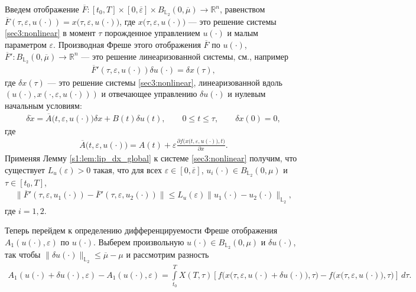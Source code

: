 \documentclass[../main.tex]{subfiles}
\begin{document}
Введем отображение $\overline{F}: [t_0,T] \times [0,\overline{\varepsilon}] \times B_{\mathbb{L}_2}(0,\overline{\mu}) \to \mathbb{R}^n$, равенством $\overline{F}(\tau,\varepsilon, u(\cdot)) = x \big(\tau,\varepsilon, u(\cdot)\big) $, где $x \big(\tau,\varepsilon, u(\cdot)\big)$ --- это решение системы \eqref{sec3:nonlinear} в момент $\tau$ порожденное управлением $u(\cdot)$ и малым параметром $\varepsilon$. 
Производная Фреше этого отображения $\overline{F}$ по $u(\cdot)$, $\overline{F}': B_{\mathbb{L}_2}(0,\overline{\mu}) \to \mathbb{R}^n $ --- это решение линеаризованной системы, см., например \cite{GusZyk}
\begin{gather}\label{dF}
 \overline{F}'(\tau,\varepsilon, u(\cdot)) \delta u(\cdot) = \delta x(\tau), 
\end{gather}
где $\delta x(\tau)$ --- это решение системы \eqref{sec3:nonlinear}, линеаризованной вдоль $(u(\cdot),x(\cdot,\varepsilon, u(\cdot)))$ и отвечающее управлению $\delta u(\cdot)$ и нулевым начальным условиям:
\begin{gather}\label{dx}
 \delta\dot{x} = \overline{A}\big(t,\varepsilon,u(\cdot)\big) \delta x + B(t)\delta u(t), \qquad 0\leqslant t \leqslant \tau, \qquad \delta x(0) = 0,
\end{gather}
где
\begin{gather*}
 \overline{A}\big(t,\varepsilon,u(\cdot)\big) = A(t) +\varepsilon \frac{\partial f\big(x(t,\varepsilon,u(\cdot)\big),t\big)}{\partial x}.
\end{gather*}
Применяя Лемму \ref{s1:lem:lip_dx_global} к системе \eqref{sec3:nonlinear} получим, что существует $L_u(\varepsilon) > 0$ такая, что для всех $\varepsilon\in [0,\overline{\varepsilon}]$, $u_i(\cdot) \in B_{\mathbb{L}_2}(0,\mu)$ и $\tau \in [t_0,T]$, 
\begin{gather*}
	\| \overline{F}'(\tau,\varepsilon, u_1(\cdot)) - \overline{F}'(\tau,\varepsilon, u_2(\cdot)) \| \leqslant L_u(\varepsilon) \| u_1(\cdot) - u_2(\cdot) \|_{\mathbb{L}_2},
\end{gather*}
где $i = 1,2$.

Теперь перейдем к определению дифференцируемости Фреше отображения $A_1(u(\cdot),\varepsilon)$ по $u(\cdot)$.
Выберем произвольную $u(\cdot) \in B_{\mathbb{L}_2}(0,\mu)$ и $\delta u(\cdot)$, так чтобы $\|\delta u(\cdot)\|_{\mathbb{L}_2} \leqslant \overline{\mu}-\mu$ и рассмотрим разность
\begin{gather}\label{diff_A}
 A_1(u(\cdot) + \delta u(\cdot),\varepsilon) - A_1(u(\cdot),\varepsilon) = \int\limits_{t_0}^T X(T,\tau) \left[ 
 f\Big(x\big(\tau,\varepsilon, u(\cdot) + \delta u(\cdot)\big),\tau\Big) - 
 f\Big(x\big(\tau,\varepsilon, u(\cdot)\big),\tau\Big) \right]\ d\tau.
\end{gather}
\end{document}
